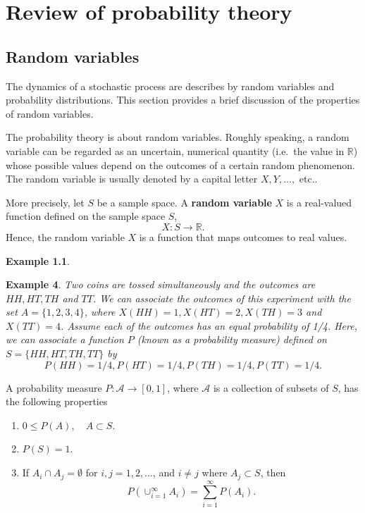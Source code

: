 \documentclass[
]{book}
\theoremstyle{definition}
\theoremstyle{definition}
\newtheorem{example}{Example}[chapter]
\theoremstyle{definition}
\theoremstyle{definition}
\theoremstyle{remark}
\begin{document}
\hypertarget{review-of-probability-theory}{%
\chapter{Review of probability theory}\label{review-of-probability-theory}}

\hypertarget{random-variables}{%
\section{Random variables}\label{random-variables}}

The dynamics of a stochastic process are describes by random variables
and probability distributions. This section provides a brief discussion
of the properties of random variables.

The probability theory is about random variables. Roughly speaking, a
random variable can be regarded as an uncertain, numerical quantity
(i.e.~the value in \(\mathbb{R}\)) whose possible values depend on the
outcomes of a certain random phenomenon. The random variable is usually
denoted by a capital letter \(X, Y, \ldots,\) etc..

More precisely, let \(S\) be a sample space. A \textbf{random variable} \(X\) is
a real-valued function defined on the sample space \(S\),
\[X : S \rightarrow \mathbb{R}.\] Hence, the random variable \(X\) is a
function that maps outcomes to real values.

\begin{example}
\protect\hypertarget{exm:unlabeled-div-4}{}\label{exm:unlabeled-div-4}

\textbf{Example 4}. \emph{Two coins are tossed simultaneously and the outcomes are
\(HH, HT, TH\) and \(TT\). We can associate the outcomes of this experiment
with the set \(A = \{1,2,3,4 \}\), where \(X(HH) = 1, X(HT) = 2, X(TH) = 3\)
and \(X(TT) = 4\). Assume each of the outcomes has an equal probability of
1/4. Here, we can associate a function \(P\) (known as a probability
measure) defined on \(S = \{HH, HT, TH, TT \}\) by
\[P(HH) = 1/4,  P(HT) = 1/4,  P(TH) = 1/4,  P(TT) = 1/4.\]}

\end{example}

A probability measure \(P : \mathcal{A} \rightarrow [0,1]\), where
\(\mathcal{A}\) is a collection of subsets of \(S\), has the following
properties

\begin{enumerate}
\def\labelenumi{\arabic{enumi}.}
\item
  \(0 \le P(A), \quad A \subset S\).
\item
  \(P(S) = 1\).
\item
  If \(A_i \cap A_j = \emptyset\) for \(i,j = 1,2, \ldots\), and
  \(i \neq j\) where \(A_j \subset S\), then
  \[P(\cup^\infty_{i=1} A_i)  = \sum^\infty_{i=1} P(A_i).\]
\end{enumerate}
\end{document}
